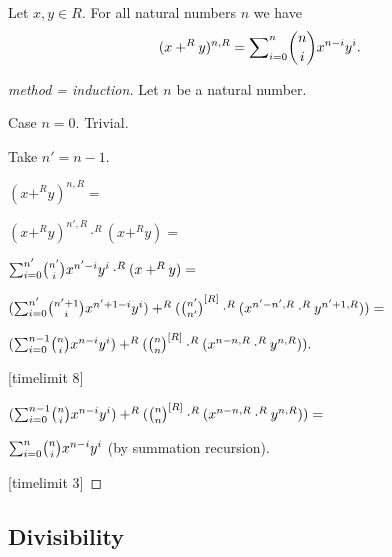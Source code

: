 \documentclass[english,11pt]{article}
\begin{document}
\begin{forthel}
\begin{theorem}
Let $x,y \in R$. For all natural numbers $n$ we have
$$(x +^{R} y)^{n,R} = \binsum{n}{n}{x}{y}{R}.$$
\end{theorem}
\begin{proof}[method = induction]
Let $n$ be a natural number.

Case $n = 0$. Trivial.

Take $n' = n-1$.

$(x +^{R} y)^{n,R} =$

$(x +^{R} y)^{n',R} \cdot^{R} (x +^{R} y) =$

$\binsum{n'}{n'}{x}{y}{R} \cdot^{R} (x +^{R} y) =$

$(\binsum{n'}{n'+1}{x}{y}{R}) +^{R} (\cho{n'}{n'}^{[R]} \cdot^{R} (x^{n'-n',R} \cdot^{R} y^{n'+1,R})) =$

$(\binsum{n-1}{n}{x}{y}{R}) +^{R} (\cho{n}{n}^{[R]} \cdot^{R} (x^{n-n,R} \cdot^{R} y^{n,R})).$

[timelimit 8]


$(\binsum{n-1}{n}{x}{y}{R}) +^{R} (\cho{n}{n}^{[R]} \cdot^{R} (x^{n-n,R} \cdot^{R} y^{n,R})) =$

$\binsum{n}{n}{x}{y}{R}$ (by summation recursion).

[timelimit 3]

\end{proof}

\end{forthel}

\subsection{Divisibility} 
\end{document}
